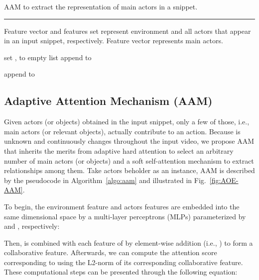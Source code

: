 \documentclass[sn-mathphys]{sn-jnl}
\theoremstyle{thmstyleone}\newtheorem{theorem}{Theorem}\newtheorem{proposition}[theorem]{Proposition}
\theoremstyle{thmstyletwo}\newtheorem{example}{Example}\newtheorem{remark}{Remark}
\theoremstyle{thmstylethree}\newtheorem{definition}{Definition}
\begin{document}
\begin{algorithm}[t]
\caption{AAM to extract the representation of main actors in a snippet.}
\label{algo:aam}
\hrule
\begin{algorithmic}[1]
\algrenewcommand{}
\algrenewcommand{}
\Require Feature vector  and features set  represent environment and all actors that appear in an input snippet, respectively.
\Ensure Feature vector  represents main actors.

\State  \State set ,  to empty list 
    \State  \State    {}
    \State append  to 
\EndFor

\State  \State  

    \If{}
        \State append  to  \EndIf
\EndFor
\State  \end{algorithmic}
\end{algorithm}

\subsection{Adaptive Attention Mechanism (AAM)}
\label{sec:aam}

Given  actors (or objects) obtained in the input snippet, only a few of those, i.e.,  main actors (or relevant objects), actually contribute to an action. Because  is unknown and continuously changes throughout the input video, we propose AAM that inherits the merits from adaptive hard attention \cite{adahard_eccv2018} to select an arbitrary number of main actors (or objects) and a soft self-attention mechanism \cite{attention_is_all_you_need} to extract relationships among them. Take actors beholder as an instance, AAM is described by the pseudocode in Algorithm~\ref{algo:aam} and illustrated in Fig.~\ref{fig:AOE-AAM}.


To begin, the environment feature  and actors features  are embedded into the same dimensional space by a multi-layer perceptrons (MLPs) parameterized by  and , respectively: 

Then,  is combined with each feature  of  by element-wise addition (i.e., ) to form a collaborative feature. Afterwards, we can compute the attention score  corresponding to  using the L2-norm of its corresponding collaborative feature. These computational steps can be presented through the following equation:
\end{document}
